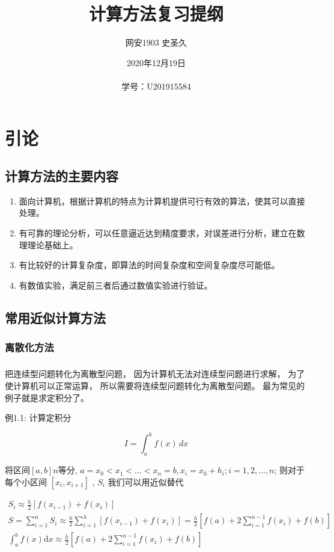 \documentclass[12pt]{report}
\title{计算方法复习提纲}
\author{网安1903 \quad 史圣久}
\date{
2020年12月19日 \\
~\\
学号：U201915584
}
\begin{document}
\maketitle
\tableofcontents

\clearpage

\chapter{引论}

\section{计算方法的主要内容}

\begin{enumerate}
	\item 面向计算机，根据计算机的特点为计算机提供可行有效的算法，使其可以直接处理。
	\item 有可靠的理论分析，可以任意逼近达到精度要求，对误差进行分析，建立在数理理论基础上。
	\item 有比较好的计算复杂度，即算法的时间复杂度和空间复杂度尽可能低。
	\item 有数值实验，满足前三者后通过数值实验进行验证。
\end{enumerate}

\section{常用近似计算方法}

\subsection{离散化方法}

\paragraph{ } 把连续型问题转化为离散型问题，
因为计算机无法对连续型问题进行求解，
为了使计算机可以正常运算，
所以需要将连续型问题转化为离散型问题。
最为常见的例子就是求定积分了。

例1.1: \quad 计算定积分

\[I = \int_a^b f(x)\, dx\]

将区间$[a, b] n$等分, \(a = x_0 < x_1 < \ldots < x_n = b,
x_i = x_0 + h_i;i = 1, 2, \ldots, n\);
则对于每个小区间 \([x_i, x_{i+1}]\) , \(S_i\) 我们可以用近似替代

\begin{gather*}
	S_i \approx \frac{h}{2}[f(x_{i-1})+f(x_{i})] \\
	S=\sum_{i=1}^n S_i \approx \frac{h}{2} \sum_{i=1}^{h}[f(x_{i-1})+f(x_{i})]=
	\frac{h}{2}[f(a)+2 \sum_{i=1}^{n-1} f(x_{i})+f(b)] \\
	\int_{a}^{b} f(x) \mathrm{d} x \approx \frac{h}{2}[f(a) +
		2 \sum_{i=1}^{n-1} f(x_{i})+f(b)]
\end{gather*}
\end{document}
